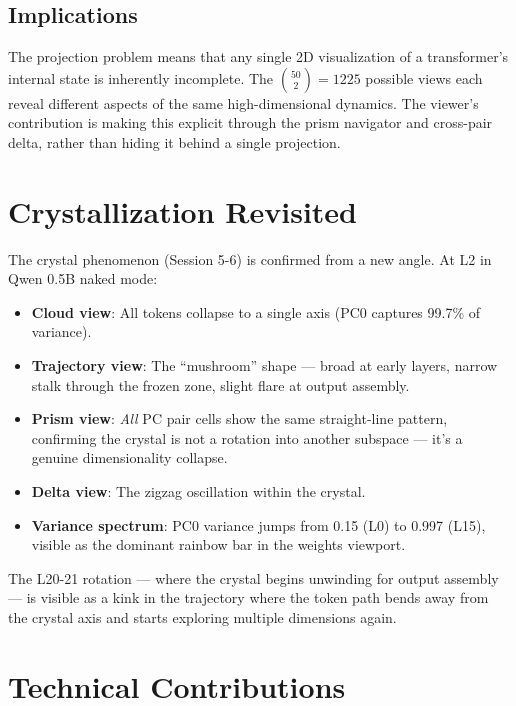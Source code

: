\documentclass[11pt,a4paper]{article}
\begin{document}
\subsection{Implications}

The projection problem means that any single 2D visualization of a transformer's internal state is inherently incomplete. The $\binom{50}{2} = 1225$ possible views each reveal different aspects of the same high-dimensional dynamics. The viewer's contribution is making this explicit through the prism navigator and cross-pair delta, rather than hiding it behind a single projection.

\section{Crystallization Revisited}

The crystal phenomenon (Session 5-6) is confirmed from a new angle. At L2 in Qwen 0.5B naked mode:

\begin{itemize}
\item \textbf{Cloud view}: All tokens collapse to a single axis (PC0 captures 99.7\% of variance).
\item \textbf{Trajectory view}: The ``mushroom'' shape — broad at early layers, narrow stalk through the frozen zone, slight flare at output assembly.
\item \textbf{Prism view}: \emph{All} PC pair cells show the same straight-line pattern, confirming the crystal is not a rotation into another subspace — it's a genuine dimensionality collapse.
\item \textbf{Delta view}: The zigzag oscillation within the crystal.
\item \textbf{Variance spectrum}: PC0 variance jumps from 0.15 (L0) to 0.997 (L15), visible as the dominant rainbow bar in the weights viewport.
\end{itemize}

The L20-21 rotation — where the crystal begins unwinding for output assembly — is visible as a kink in the trajectory where the token path bends away from the crystal axis and starts exploring multiple dimensions again.

\section{Technical Contributions}
\end{document}
